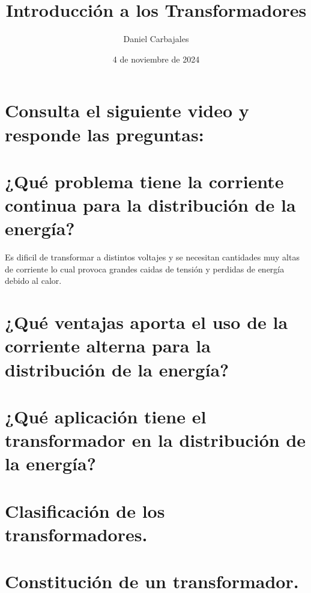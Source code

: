 \documentclass{report}
\title{\Huge{Introducción a los Transformadores}}
\author{\large{Daniel Carbajales}}
\date{4 de noviembre de 2024}
\begin{document}

\newpage
\Large{\section*{Consulta el siguiente video y responde las preguntas:}\label{chapter:1}}
\setcounter{chapter}{1}
\vspace{1em}
\section{¿Qué problema tiene la corriente continua para la distribución de la energía?}
Es dificil de transformar a distintos voltajes y se necesitan cantidades muy altas de corriente lo cual provoca grandes caidas de tensión y
perdidas de energía debido al calor.

\section{¿Qué ventajas aporta el uso de la corriente alterna para la distribución de la energía?}


\section{¿Qué aplicación tiene el transformador en la distribución de la energía?}

\section{Clasificación de los transformadores.}

\section{Constitución de un transformador.}
\end{document}
